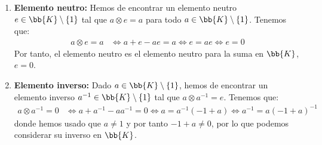 \begin{ejercicio}
\begin{enumerate}
        \item \textbf{Elemento neutro:} Hemos de encontrar un elemento neutro $e\in \bb{K}\setminus \{1\}$ tal que $a\otimes e=a$ para todo $a\in \bb{K}\setminus \{1\}$. Tenemos que:
        \begin{align*}
            a\otimes e = a &\iff a+e-ae=a\iff e=ae\iff e=0
        \end{align*}
        Por tanto, el elemento neutro es el elemento neutro para la suma en $\bb{K}$, $e=0$.

        \item \textbf{Elemento inverso:} Dado $a\in \bb{K}\setminus \{1\}$, hemos de encontrar un elemento inverso $a^{-1}\in \bb{K}\setminus \{1\}$ tal que $a\otimes a^{-1}=e$. Tenemos que:
        \begin{align*}
            a\otimes a^{-1} = 0 &\iff a+a^{-1}-aa^{-1}=0\iff a=a^{-1}(-1+a)\iff a^{-1}=a(-1+a)^{-1}
        \end{align*}
        donde hemos usado que $a\neq 1$ y por tanto $-1+a\neq 0$, por lo que podemos considerar su inverso en $\bb{K}$.
    \end{enumerate}
\end{ejercicio}

